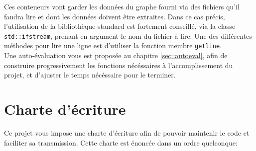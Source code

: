 \documentclass[9pts]{article}
\begin{document}
Ces conteneurs vont garder les données du graphe fourni via des fichiers qu'il faudra lire et dont les données doivent être extraites.
Dans ce cas précis, l'utilisation de la bibliothèque standard est fortement conseillé, via la classe \texttt{std::ifstream}, prenant en argument le nom du fichier à lire. Une des différentes méthodes pour lire une ligne est d'utiliser la fonction membre \texttt{getline}.\\

Une auto-évaluation vous est proposée au chapitre \ref{sec::autoeval}, afin de construire progressivement les fonctions nécéssaires à l'accomplissement du projet, et d'ajuster le temps nécéssaire pour le terminer.

\section{Charte d'écriture}
\label{sec::charte}
Ce projet vous impose une charte d'écriture afin de pouvoir maintenir le code et faciliter sa transmission. Cette charte est énoncée dans un ordre quelconque:\\
\end{document}
